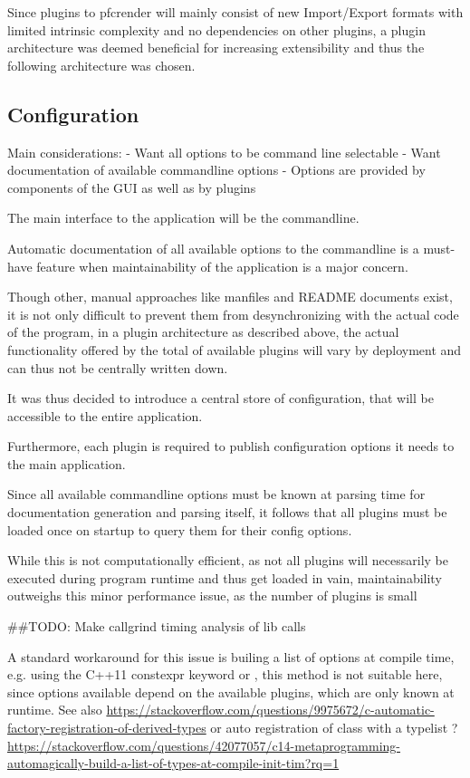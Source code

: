 Since plugins to pfcrender will mainly consist of new Import/Export formats with limited intrinsic complexity and no dependencies on other plugins, a plugin architecture was deemed beneficial for increasing extensibility and thus the following architecture was chosen.


\subsection{Configuration}
Main considerations:
- Want all options to be command line selectable
- Want documentation of available commandline options
- Options are provided by components of the GUI as well as by plugins

The main interface to the application will be the commandline.

Automatic documentation of all available options to the commandline is a must-have feature when maintainability of the application is a major concern.

Though other, manual approaches like manfiles and README documents exist, it is not only difficult to prevent them from desynchronizing with the actual code of the program, in a plugin architecture as described above, the actual functionality offered by the total of available plugins will vary by deployment and can thus not be centrally written down.

It was thus decided to introduce a central store of configuration, that will be accessible to the entire application.

Furthermore, each plugin is required to publish configuration options it needs to the main application.

Since all available commandline options must be known at parsing time for documentation generation and parsing itself, it follows that all plugins must be loaded once on startup to query them for their config options.

While this is not computationally efficient, as not all plugins will necessarily be executed during program runtime and thus get loaded in vain, maintainability outweighs this minor performance issue, as the number of plugins is small

##TODO: Make callgrind timing analysis of lib calls 

A standard workaround for this issue is builing a list of options at compile time, e.g. using the C++11 \code constexpr keyword or , this method is not suitable here, since options available depend on the available plugins, which are only known at runtime.
See also \url{https://stackoverflow.com/questions/9975672/c-automatic-factory-registration-of-derived-types}
or auto registration of class with a typelist ?
\url{https://stackoverflow.com/questions/42077057/c14-metaprogramming-automagically-build-a-list-of-types-at-compile-init-tim?rq=1}

